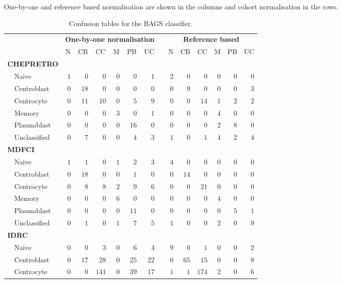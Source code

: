 \begin{table}[!tbp]
{\small
\caption{Confusion tables for the BAGS classifier.} One-by-one and reference
based normalisation are shown in the columns and cohort normalisation in the
rows.\label{tab:BAGShemaclass}} 
\begin{center}
\begin{tabular}{lrrrrrrcrrrrrr}
\hline\hline
\multicolumn{1}{l}{\bfseries }&\multicolumn{6}{c}{\bfseries One-by-one normalisation}&\multicolumn{1}{c}{\bfseries }&\multicolumn{6}{c}{\bfseries Reference based}\tabularnewline
\cline{2-7} \cline{9-14}
\multicolumn{1}{l}{}&\multicolumn{1}{c}{N}&\multicolumn{1}{c}{CB}&\multicolumn{1}{c}{CC}&\multicolumn{1}{c}{M}&\multicolumn{1}{c}{PB}&\multicolumn{1}{c}{UC}&\multicolumn{1}{c}{}&\multicolumn{1}{c}{N}&\multicolumn{1}{c}{CB}&\multicolumn{1}{c}{CC}&\multicolumn{1}{c}{M}&\multicolumn{1}{c}{PB}&\multicolumn{1}{c}{UC}\tabularnewline
\hline
{\bfseries CHEPRETRO}&&&&&&&&&&&&&\tabularnewline
~~Naive&$1$&$ 0$&$  0$&$0$&$ 0$&$ 1$&&$2$&$ 0$&$  0$&$ 0$&$ 0$&$ 0$\tabularnewline
~~Centroblast&$0$&$18$&$  0$&$0$&$ 0$&$ 0$&&$0$&$ 9$&$  0$&$ 0$&$ 0$&$ 3$\tabularnewline
~~Centrocyte&$0$&$11$&$ 10$&$0$&$ 5$&$ 9$&&$0$&$ 0$&$ 14$&$ 1$&$ 2$&$ 2$\tabularnewline
~~Memory&$0$&$ 0$&$  0$&$3$&$ 0$&$ 1$&&$0$&$ 0$&$  0$&$ 4$&$ 0$&$ 0$\tabularnewline
~~Plasmablast&$0$&$ 0$&$  0$&$0$&$16$&$ 0$&&$0$&$ 0$&$  0$&$ 2$&$ 8$&$ 0$\tabularnewline
~~Unclassified&$0$&$ 7$&$  0$&$0$&$ 4$&$ 3$&&$1$&$ 0$&$  1$&$ 4$&$ 2$&$ 4$\tabularnewline
\hline
{\bfseries MDFCI}&&&&&&&&&&&&&\tabularnewline
~~Naive&$1$&$ 1$&$  0$&$1$&$ 2$&$ 3$&&$4$&$ 0$&$  0$&$ 0$&$ 0$&$ 0$\tabularnewline
~~Centroblast&$0$&$18$&$  0$&$0$&$ 1$&$ 0$&&$0$&$14$&$  0$&$ 0$&$ 0$&$ 0$\tabularnewline
~~Centrocyte&$0$&$ 8$&$  8$&$2$&$ 9$&$ 6$&&$0$&$ 0$&$ 21$&$ 0$&$ 0$&$ 0$\tabularnewline
~~Memory&$0$&$ 0$&$  0$&$6$&$ 0$&$ 0$&&$0$&$ 0$&$  0$&$ 4$&$ 0$&$ 0$\tabularnewline
~~Plasmablast&$0$&$ 0$&$  0$&$0$&$11$&$ 0$&&$0$&$ 0$&$  0$&$ 0$&$ 5$&$ 1$\tabularnewline
~~Unclassified&$0$&$ 1$&$  0$&$1$&$ 7$&$ 5$&&$1$&$ 0$&$  0$&$ 2$&$ 0$&$ 9$\tabularnewline
\hline
{\bfseries IDRC}&&&&&&&&&&&&&\tabularnewline
~~Naive&$0$&$ 0$&$  3$&$0$&$ 6$&$ 4$&&$9$&$ 0$&$  1$&$ 0$&$ 0$&$ 2$\tabularnewline
~~Centroblast&$0$&$17$&$ 28$&$0$&$25$&$22$&&$0$&$65$&$ 15$&$ 0$&$ 0$&$ 8$\tabularnewline
~~Centrocyte&$0$&$ 0$&$141$&$0$&$39$&$17$&&$1$&$ 1$&$174$&$ 2$&$ 0$&$ 6$\tabularnewline

\end{tabular}
\end{center}
\end{table}
